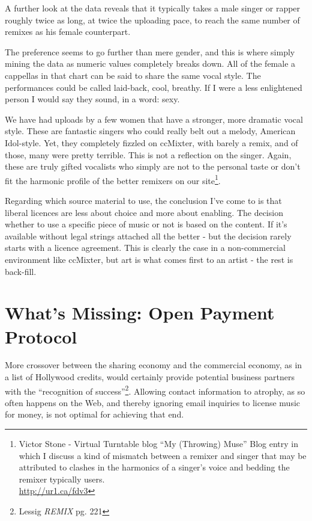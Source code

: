 A further look at the data reveals that it typically takes a male singer or
rapper roughly twice as long, at twice the uploading pace, to reach the same
number of remixes as his female counterpart.

The preference seems to go further than mere gender, and this is where simply
mining the data as numeric values completely breaks down. All of the female a
cappellas in that chart can be said to share the same vocal style. The
performances could be called laid-back, cool, breathy. If I were a less
enlightened person I would say they sound, in a word: sexy.

We have had uploads by a few women that have a stronger, more dramatic vocal
style. These are fantastic singers who could really belt out a melody, American
Idol-style. Yet, they completely f\hbox{}izzled on ccMixter, with barely a remix, and
of those, many were pretty terrible. This is not a ref\hbox{}lection on the singer.
Again, these are truly gifted vocalists who simply are not to the personal taste
or don't f\hbox{}it the harmonic prof\hbox{}ile of the better remixers on our
site\footnote{Victor Stone - Virtual Turntable blog ``My (Throwing) Muse'' Blog
entry in which I discuss a kind of mismatch between a remixer and singer that
may be attributed to clashes in the harmonics of a singer's voice and bedding
the remixer typically users.\\
\url{http://ur1.ca/fdv3}}.

Regarding which source material to use, the conclusion I've come to is that
liberal licences are less about choice and more about enabling. The decision
whether to use a specif\hbox{}ic piece of music or not is based on the content. If it's
available without legal strings attached all the better - but the decision
rarely starts with a licence agreement. This is clearly the case in a
non-commercial environment like ccMixter, but art is what comes f\hbox{}irst to an
artist - the rest is back-f\hbox{}ill.


\section{What's Missing: Open Payment Protocol}
\label{s:unexpected_collaboration:open_payment_protocol}

More crossover between the sharing economy and the commercial economy, as in a
list of Hollywood credits, would certainly provide potential business partners
with the ``recognition of success''\footnote{Lessig \textit{REMIX} pg. 221}.
Allowing contact information to atrophy, as so often happens on the Web, and
thereby ignoring email inquiries to license music for money, is not optimal for
achieving that end.


